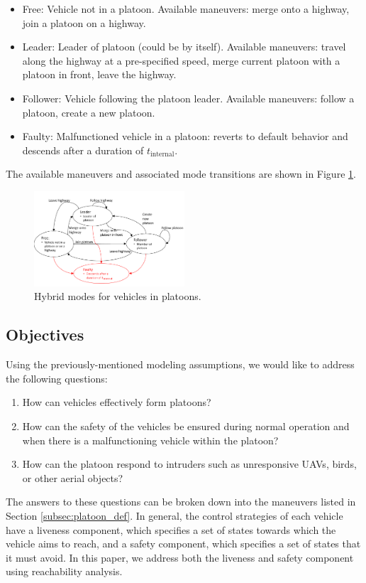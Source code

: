 \begin{itemize}
\item Free: Vehicle not in a platoon. Available maneuvers: merge onto a highway, join a platoon on a highway.
\item Leader: Leader of platoon (could be by itself). Available maneuvers: travel along the highway at a pre-specified speed, merge current platoon with a platoon in front, leave the highway.
\item Follower: Vehicle following the platoon leader. Available maneuvers: follow a platoon, create a new platoon.
\item Faulty: Malfunctioned vehicle in a platoon: reverts to default behavior and descends after a duration of $t_\text{internal}$.
\end{itemize}

The available maneuvers and associated mode transitions are shown in Figure \ref{fig:vehicleModes}.

\begin{figure}
	\centering
	\includegraphics[width=0.5\textwidth]{fig/vehicleModes}
	\caption{Hybrid modes for vehicles in platoons.}
	\label{fig:vehicleModes}
\end{figure}

\subsection{Objectives}
Using the previously-mentioned modeling assumptions, we would like to address the following questions:

\begin{enumerate}
\item How can vehicles effectively form platoons?
\item How can the safety of the vehicles be ensured during normal operation and when there is a malfunctioning vehicle within the platoon?
\item How can the platoon respond to intruders such as unresponsive UAVs, birds, or other aerial objects?
\end{enumerate}

The answers to these questions can be broken down into the maneuvers listed in Section \ref{subsec:platoon_def}. In general, the control strategies of each vehicle have a liveness component, which specifies a set of states towards which the vehicle aims to reach, and a safety component, which specifies a set of states that it must avoid. In this paper, we address both the liveness and safety component using reachability analysis.